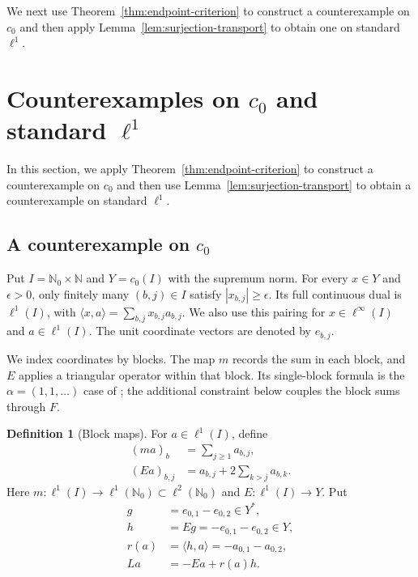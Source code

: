 \documentclass[11pt]{article}
\newcommand{\N}{\mathbb N}
\newcommand{\Nzero}{\mathbb N_0}
\newcommand{\pair}[2]{\langle #1,#2\rangle}
\theoremstyle{definition}
\newtheorem{definition}{Definition}
\theoremstyle{remark}
\begin{document}
We next use Theorem~\ref{thm:endpoint-criterion} to construct a
counterexample on $c_0$ and then apply Lemma~\ref{lem:surjection-transport}
to obtain one on standard $\ell^1$.

\section{Counterexamples on $c_0$ and standard $\ell^1$}
\label{sec:counterexamples}
In this section, we apply Theorem~\ref{thm:endpoint-criterion} to
construct a counterexample on $c_0$ and then use
Lemma~\ref{lem:surjection-transport} to obtain a counterexample on
standard $\ell^1$.



\subsection{A counterexample on $c_0$}

Put $I=\Nzero\times\N$ and $Y=c_0(I)$ with the supremum norm.
For every $x\in Y$ and $\epsilon>0$, only finitely many $(b,j)\in I$
satisfy $|x_{b,j}|\ge\epsilon$. Its full continuous dual is $\ell^1(I)$,
with $\pair{x}{a}=\sum_{b,j}x_{b,j}a_{b,j}$. We also use this pairing
for $x\in\ell^\infty(I)$ and $a\in\ell^1(I)$.
The unit coordinate vectors are denoted by $e_{b,j}$.

We index coordinates by blocks. The map $m$ records the sum in each block,
and $E$ applies a triangular operator within that block. Its single-block
formula is the $\alpha=(1,1,\ldots)$ case of
\cite[author version, Example~4.1]{bauschkeetal2011}; the additional constraint below
couples the block sums through $F$.
\begin{definition}[Block maps]
For $a\in\ell^1(I)$, define
\begin{equation}
\begin{aligned}
(ma)_b&=\sum_{j\ge1}a_{b,j},\\
(Ea)_{b,j}&=a_{b,j}+2\sum_{k>j}a_{b,k}.
\end{aligned}
\label{eq:D4}
\end{equation}
Here $m:\ell^1(I)\to\ell^1(\Nzero)\subset\ell^2(\Nzero)$ and
$E:\ell^1(I)\to Y$. Put
\begin{equation}
\begin{aligned}
g&=e_{0,1}-e_{0,2}\in Y^*,\\
h&=Eg=-e_{0,1}-e_{0,2}\in Y,\\
r(a)&=\pair{h}{a}=-a_{0,1}-a_{0,2},\\
La&=-Ea+r(a)h.
\end{aligned}
\label{eq:D5}
\end{equation}
\end{definition}
\end{document}
